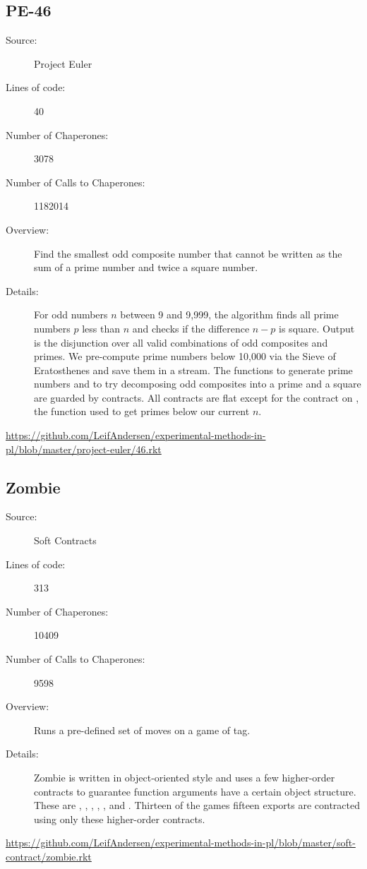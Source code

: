 \subsection*{PE-46~\hrulefill}
\begin{description}
\item[Source:] Project Euler
\item[Lines of code:] 40
\item[Number of Chaperones:] 3078
\item[Number of Calls to Chaperones:] 1182014
\item[Overview:]
  Find the smallest odd composite number that cannot be written as the sum of a prime number and twice a square number.
\item[Details:] 
  For odd numbers $n$ between 9 and 9,999, the algorithm finds all prime numbers $p$ less than $n$ and checks if the difference $n - p$ is square.
  Output is the  disjunction over all valid combinations of odd composites and primes.
  We pre-compute prime numbers below 10,000 via the Sieve of Eratosthenes and save them in a stream.
  The functions to generate prime numbers and to try decomposing odd composites into a prime and a square are guarded by contracts.
  All contracts are flat except for the contract on , the function used to get primes below our current $n$.
\end{description}
\url{https://github.com/LeifAndersen/experimental-methods-in-pl/blob/master/project-euler/46.rkt}

\subsection*{Zombie~\hrulefill}
\begin{description}
\item[Source:] Soft Contracts
\item[Lines of code:] 313
\item[Number of Chaperones:] 10409
\item[Number of Calls to Chaperones:] 9598
\item[Overview:]
  Runs a pre-defined set of moves on a game of tag.
\item[Details:]
  Zombie is written in object-oriented style and uses a few higher-order contracts to guarantee function arguments have a certain object structure.
  These are , , , , , and .
  Thirteen of the games fifteen exports are contracted using only these higher-order contracts.
\end{description}
\url{https://github.com/LeifAndersen/experimental-methods-in-pl/blob/master/soft-contract/zombie.rkt}

